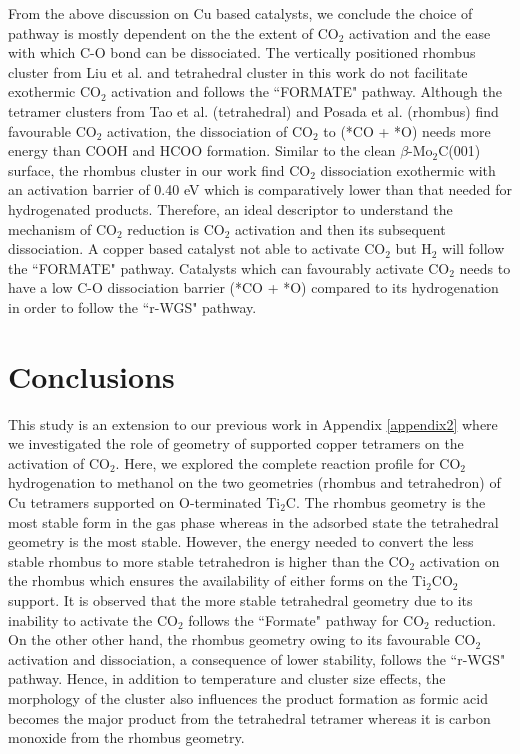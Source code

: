 From the above discussion on Cu based catalysts, we conclude the choice of pathway is mostly dependent on the the extent of CO$_2$ activation and the ease with which C-O bond can be dissociated. The vertically positioned rhombus cluster from Liu et al.\cite{liu2015carbon} and tetrahedral cluster in this work do not facilitate exothermic CO$_2$ activation and follows the ``FORMATE" pathway. Although the tetramer clusters from Tao et al.\cite{tao2019best} (tetrahedral) and Posada et al.\cite{posada2016conversion} (rhombus) find favourable CO$_2$ activation, the dissociation of CO$_2$ to (*CO + *O) needs more energy than COOH and HCOO formation. Similar to the clean $\beta$-Mo$_2$C(001) surface, the rhombus cluster in our work find CO$_2$ dissociation exothermic with an activation barrier of 0.40 eV which is comparatively lower than that needed for hydrogenated products. Therefore, an ideal descriptor to understand the mechanism of CO$_2$ reduction is CO$_2$ activation and then its subsequent dissociation. A copper based catalyst not able to activate CO$_2$ but H$_2$ will follow the ``FORMATE" pathway. Catalysts which can favourably activate CO$_2$ needs to have a low C-O dissociation barrier (*CO + *O) compared to its hydrogenation in order to follow the ``r-WGS" pathway.   

\section{Conclusions}
\label{concle}
This study is an extension to our previous work in Appendix \ref{appendix2} where we investigated the role of geometry of supported copper tetramers on the activation of CO$_2$. Here, we explored the complete reaction profile for CO$_2$ hydrogenation to methanol on the two geometries (rhombus and tetrahedron) of Cu tetramers supported on O-terminated Ti$_2$C. The rhombus geometry is the most stable form in the gas phase whereas in the adsorbed state the tetrahedral geometry is the most stable. However, the energy needed to convert the less stable rhombus to more stable tetrahedron is higher than the CO$_2$ activation on the rhombus which ensures the availability of either forms on the Ti$_2$CO$_2$ support. It is observed that the more stable tetrahedral geometry due to its inability to activate the CO$_2$ follows the ``Formate" pathway for CO$_2$ reduction. On the other other hand, the rhombus geometry owing to its favourable CO$_2$ activation and dissociation, a consequence of lower stability, follows the ``r-WGS" pathway. Hence, in addition to temperature and cluster size effects, the morphology of the cluster also influences the product formation as formic acid becomes the major product from the tetrahedral tetramer whereas it is carbon monoxide from the rhombus geometry. 

